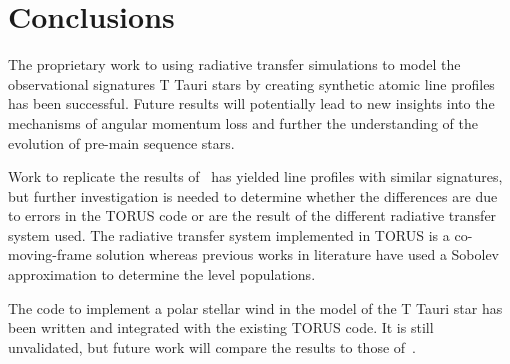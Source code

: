 \documentclass[fleqn,usenatbib]{mnras}
\begin{document}
\section{Conclusions}
\label{sec:conclusions}
The proprietary work to using radiative transfer simulations to model the observational signatures T Tauri stars by creating synthetic atomic line profiles has been successful. Future results will potentially lead to new insights into the mechanisms of angular momentum loss and further the understanding of the evolution of pre-main sequence stars.

Work to replicate the results of~\citet{1998ApJ...492..743M} has yielded line profiles with similar signatures, but further investigation is needed to determine whether the differences are due to errors in the TORUS code or are the result of the different radiative transfer system used. The radiative transfer system implemented in TORUS is a co-moving-frame solution whereas previous works in literature \citep[e.g.][]{Lima:2010bo,Kurosawa:2006gd,1998ApJ...492..743M,Hartmann:1994tl} have used a Sobolev approximation to determine the level populations.

The code to implement a polar stellar wind in the model of the T Tauri star has been written and integrated with the existing TORUS code. It is still unvalidated, but future work will compare the results to those of~\citet{Kurosawa:2011fh}.











\bsp    %
\label{lastpage}
\end{document}
